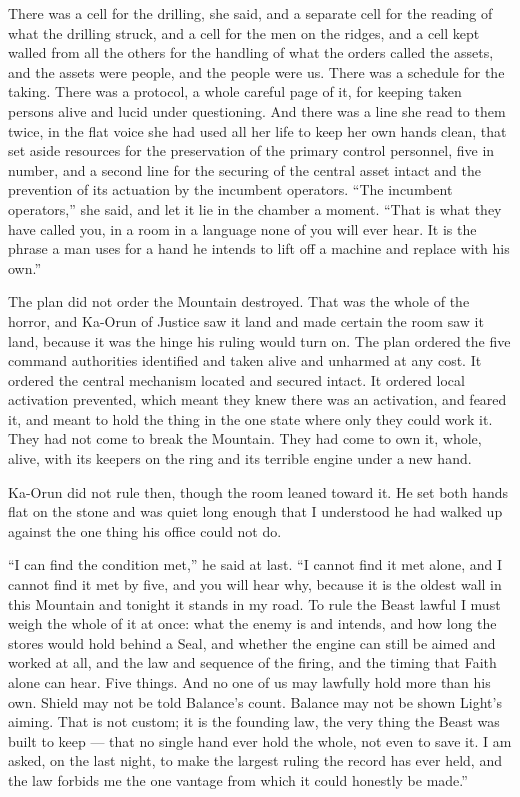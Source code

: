 There was a cell for the drilling, she said, and a separate cell for the reading of what the drilling struck, and a cell for the men on the ridges, and a cell kept walled from all the others for the handling of what the orders called the assets, and the assets were people, and the people were us. There was a schedule for the taking. There was a protocol, a whole careful page of it, for keeping taken persons alive and lucid under questioning. And there was a line she read to them twice, in the flat voice she had used all her life to keep her own hands clean, that set aside resources for the preservation of the primary control personnel, five in number, and a second line for the securing of the central asset intact and the prevention of its actuation by the incumbent operators. ``The incumbent operators,'' she said, and let it lie in the chamber a moment. ``That is what they have called you, in a room in a language none of you will ever hear. It is the phrase a man uses for a hand he intends to lift off a machine and replace with his own.''\par

The plan did not order the Mountain destroyed. That was the whole of the horror, and Ka-Orun of Justice saw it land and made certain the room saw it land, because it was the hinge his ruling would turn on. The plan ordered the five command authorities identified and taken alive and unharmed at any cost. It ordered the central mechanism located and secured intact. It ordered local activation prevented, which meant they knew there was an activation, and feared it, and meant to hold the thing in the one state where only they could work it. They had not come to break the Mountain. They had come to own it, whole, alive, with its keepers on the ring and its terrible engine under a new hand.\par

\ornament

Ka-Orun did not rule then, though the room leaned toward it. He set both hands flat on the stone and was quiet long enough that I understood he had walked up against the one thing his office could not do.\par

``I can find the condition met,'' he said at last. ``I cannot find it met alone, and I cannot find it met by five, and you will hear why, because it is the oldest wall in this Mountain and tonight it stands in my road. To rule the Beast lawful I must weigh the whole of it at once: what the enemy is and intends, and how long the stores would hold behind a Seal, and whether the engine can still be aimed and worked at all, and the law and sequence of the firing, and the timing that Faith alone can hear. Five things. And no one of us may lawfully hold more than his own. Shield may not be told Balance's count. Balance may not be shown Light's aiming. That is not custom; it is the founding law, the very thing the Beast was built to keep --- that no single hand ever hold the whole, not even to save it. I am asked, on the last night, to make the largest ruling the record has ever held, and the law forbids me the one vantage from which it could honestly be made.''\par

